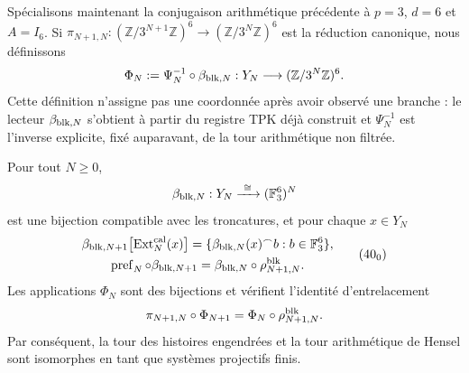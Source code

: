 Spécialisons maintenant la conjugaison arithmétique précédente à
\(p=3\), \(d=6\) et \(A=I_6\). Si
\(\pi_{N+1,N}:(\mathbb Z/3^{N+1}\mathbb Z)^6\to
(\mathbb Z/3^N\mathbb Z)^6\) est la réduction canonique, nous définissons
\begin{equation}
 \Phi_N:=\Psi_N^{-1}\circ\beta_{{\rm blk},N}:
 Y_N\longrightarrow(\mathbb Z/3^N\mathbb Z)^6.
 \label{ix:eq:phi-hensel-bloques-ch}
\end{equation}
Cette définition n’assigne pas une coordonnée après avoir observé une branche : le
lecteur \(\beta_{{\rm blk},N}\) s’obtient à partir du registre TPK déjà construit et
\(\Psi_N^{-1}\) est l’inverse explicite, fixé auparavant, de la tour
arithmétique non filtrée.

\begin{proposition}
\label{ix:prop:cobertura-729-seccion}
Pour tout \(N\geq0\),
\[
 \beta_{{\rm blk},N}:Y_N\xrightarrow{\ \cong\ }
 (\mathbb F_3^6)^N
\]
est une bijection compatible avec les troncatures, et pour chaque \(x\in Y_N\)
\[
 \begin{gathered}
 \beta_{{\rm blk},N+1}
 \bigl[\operatorname{Ext}^{\rm cal}_N(x)\bigr]
 =\{\beta_{{\rm blk},N}(x)^\frown b:
       b\in\mathbb F_3^6\},\\
 \operatorname{pref}_N\circ\beta_{{\rm blk},N+1}
 =\beta_{{\rm blk},N}\circ\rho^{\rm blk}_{N+1,N}.
 \end{gathered}
\tag{40$_0$}
\label{ix:eq:cobertura-729-ch}
\]
Les applications \(\Phi_N\) sont des bijections et vérifient l’identité
d’entrelacement
\begin{equation}
 \pi_{N+1,N}\circ\Phi_{N+1}
 =\Phi_N\circ\rho^{\rm blk}_{N+1,N}.
 \label{ix:eq:entrelazamiento-hensel-ext-ch}
\end{equation}
Par conséquent, la tour des histoires engendrées et la tour arithmétique de Hensel sont isomorphes en tant que systèmes projectifs finis.
\end{proposition}

